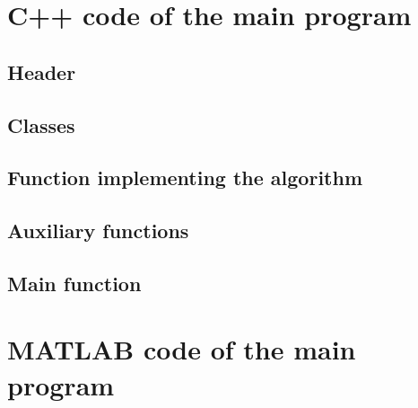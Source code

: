 \chapter{C++ code of the main program}
\label{Appendix: C++ code of the main program.}


\section{Header}


\newpage
\section{Classes}



\newpage
\section{Function implementing the algorithm}


\newpage
\section{Auxiliary functions}


\newpage
\section{Main function}


\chapter{MATLAB code of the main program}
\label{Appendix: Matlab code of the main program.}

